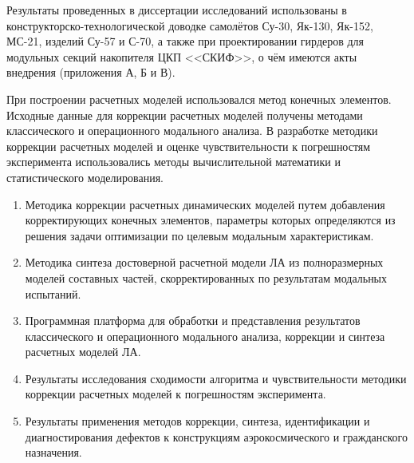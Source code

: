 Результаты проведенных в диссертации исследований использованы в конструкторско-технологической доводке самолётов Су-30, Як-130, Як-152, МС-21, изделий Су-57 и С-70, а также при проектировании гирдеров для модульных секций накопителя ЦКП <<СКИФ>>, о чём имеются акты внедрения (приложения А, Б и В).

{\methods}

При построении расчетных моделей использовался метод конечных элементов. Исходные данные для коррекции расчетных моделей получены методами классического и операционного модального анализа. В разработке методики коррекции расчетных моделей и оценке чувствительности к погрешностям эксперимента использовались методы вычислительной математики и статистического моделирования. 

{}
\begin{enumerate}[beginpenalty = 10000] 
	\item Методика коррекции расчетных динамических моделей путем добавления корректирующих конечных элементов, параметры которых определяются из решения задачи оптимизации по целевым модальным характеристикам.
	\item Методика синтеза достоверной расчетной модели ЛА из полноразмерных моделей составных частей, скорректированных по результатам модальных испытаний.
	\item Программная платформа для обработки и представления результатов классического и операционного модального анализа, коррекции и синтеза расчетных моделей ЛА.
	\item Результаты исследования сходимости алгоритма и чувствительности методики коррекции расчетных моделей к погрешностям эксперимента. 
	\item Результаты применения методов коррекции, синтеза, идентификации и диагностирования дефектов к конструкциям аэрокосмического и гражданского назначения.
\end{enumerate}

{\reliability} 


